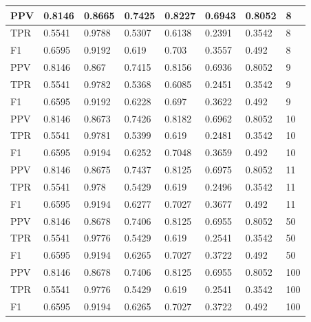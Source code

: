 \documentclass{classrep}
\begin{document}
\begin{table}[H]
\begin{adjustbox}{max width=\textwidth}
\begin{tabular}{|l|l|l|l|l|l|l|l|}
        PPV & 0.8146 & 0.8665 & 0.7425 & 0.8227 & 0.6943 & 0.8052 & 8 \\ \hline
        TPR & 0.5541 & 0.9788 & 0.5307 & 0.6138 & 0.2391 & 0.3542 & 8 \\ \hline
        F1 & 0.6595 & 0.9192 & 0.619 & 0.703 & 0.3557 & 0.492 & 8 \\ \hline
        PPV & 0.8146 & 0.867 & 0.7415 & 0.8156 & 0.6936 & 0.8052 & 9 \\ \hline
        TPR & 0.5541 & 0.9782 & 0.5368 & 0.6085 & 0.2451 & 0.3542 & 9 \\ \hline
        F1 & 0.6595 & 0.9192 & 0.6228 & 0.697 & 0.3622 & 0.492 & 9 \\ \hline
        PPV & 0.8146 & 0.8673 & 0.7426 & 0.8182 & 0.6962 & 0.8052 & 10 \\ \hline
        TPR & 0.5541 & 0.9781 & 0.5399 & 0.619 & 0.2481 & 0.3542 & 10 \\ \hline
        F1 & 0.6595 & 0.9194 & 0.6252 & 0.7048 & 0.3659 & 0.492 & 10 \\ \hline
        PPV & 0.8146 & 0.8675 & 0.7437 & 0.8125 & 0.6975 & 0.8052 & 11 \\ \hline
        TPR & 0.5541 & 0.978 & 0.5429 & 0.619 & 0.2496 & 0.3542 & 11 \\ \hline
        F1 & 0.6595 & 0.9194 & 0.6277 & 0.7027 & 0.3677 & 0.492 & 11 \\ \hline
        PPV & 0.8146 & 0.8678 & 0.7406 & 0.8125 & 0.6955 & 0.8052 & 50 \\ \hline
        TPR & 0.5541 & 0.9776 & 0.5429 & 0.619 & 0.2541 & 0.3542 & 50 \\ \hline
        F1 & 0.6595 & 0.9194 & 0.6265 & 0.7027 & 0.3722 & 0.492 & 50 \\ \hline
        PPV & 0.8146 & 0.8678 & 0.7406 & 0.8125 & 0.6955 & 0.8052 & 100 \\ \hline
        TPR & 0.5541 & 0.9776 & 0.5429 & 0.619 & 0.2541 & 0.3542 & 100 \\ \hline
        F1 & 0.6595 & 0.9194 & 0.6265 & 0.7027 & 0.3722 & 0.492 & 100 \\ \hline
    \end{tabular}
\end{adjustbox}
\end{table}
\end{document}
